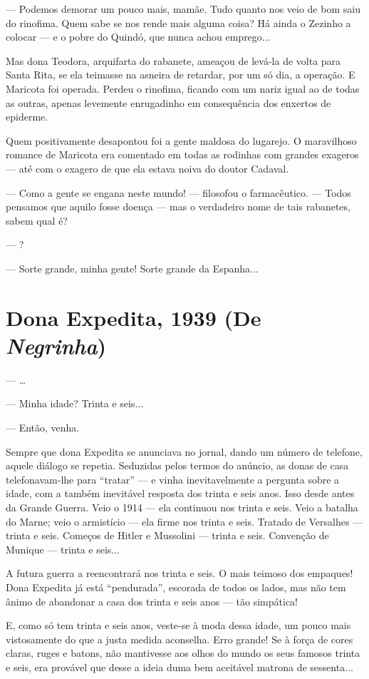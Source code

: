 --- Podemos demorar um pouco mais, mamãe. Tudo quanto nos veio de bom
saiu do rinofima. Quem sabe se nos rende mais alguma coisa? Há ainda o
Zezinho a colocar --- e o pobre do Quindó, que nunca achou emprego...

Mas dona Teodora, arquifarta do rabanete, ameaçou de levá-la de volta
para Santa Rita, se ela teimasse na asneira de retardar, por um só dia,
a operação. E Maricota foi operada. Perdeu o rinofima, ficando com um
nariz igual ao de todas as outras, apenas levemente enrugadinho em
consequência dos enxertos de epiderme.

Quem positivamente desapontou foi a gente maldosa do lugarejo. O
maravilhoso romance de Maricota era comentado em todas as rodinhas com
grandes exageros --- até com o exagero de que ela estava noiva do doutor
Cadaval.

--- Como a gente se engana neste mundo! --- filosofou o farmacêutico.
--- Todos pensamos que aquilo fosse doença --- mas o verdadeiro nome de
tais rabanetes, sabem qual é?

--- ?

--- Sorte grande, minha gente! Sorte grande da Espanha...

\chapter{Dona Expedita, 1939 (De \emph{Negrinha})}

--- \ldots{}

--- Minha idade? Trinta e seis...

--- Então, venha.

Sempre que dona Expedita se anunciava no jornal, dando um número de
telefone, aquele diálogo se repetia. Seduzidas pelos termos do anúncio,
as donas de casa telefonavam-lhe para ``tratar'' --- e vinha
inevitavelmente a pergunta sobre a idade, com a também inevitável
resposta dos trinta e seis anos. Isso desde antes da Grande Guerra. Veio
o 1914 --- ela continuou nos trinta e seis. Veio a batalha do Marne;
veio o armistício --- ela firme nos trinta e seis. Tratado de Versalhes
--- trinta e seis. Começos de Hitler e Mussolini --- trinta e seis.
Convenção de Munique --- trinta e seis...

A futura guerra a reencontrará nos trinta e seis. O mais teimoso dos
empaques! Dona Expedita já está ``pendurada'', escorada de todos os
lados, mas não tem ânimo de abandonar a casa dos trinta e seis anos ---
tão simpática!

E, como só tem trinta e seis anos, veste-se à moda dessa idade, um pouco
mais vistosamente do que a justa medida aconselha. Erro grande! Se à
força de cores claras, ruges e batons, não mantivesse aos olhos do mundo
os seus famosos trinta e seis, era provável que desse a ideia duma bem
aceitável matrona de sessenta...

